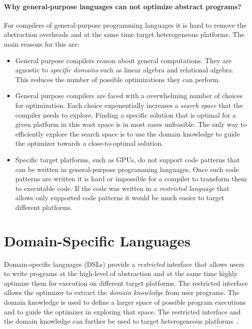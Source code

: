 \paragraph{Why general-purpose languages can not optimize abstract programs?} For compilers of
 general-purpose programming languages it is hard to remove the abstraction overheads
 and at the same time target heterogeneous platforms. The main reasons for this are:\begin{itemize}

 \item General purpose compilers reason about general computations. They are agnostic to
  \emph{specific domains} such as linear algebra and relational algebra. This reduces
   the number of possible optimizations they can perform.

 \item General purpose compilers are faced with a overwhelming number of choices
   for optimization. Each choice exponentially increases a \emph{search space}
   that the compiler needs to explore. Finding a specific solution that is optimal
   for a given platform in this wast space is in most cases unfeasible. The only way
   to efficiently explore the search space is to use the domain knowledge to guide
   the optimizer towards a close-to-optimal solution.

  \item Specific target platforms, such as GPUs, do not support code patterns
  that can be written in general-purpose programming languages. Once such code patterns are
  written it is hard or impossible for a compiler to transform them to executable code.
  If the code was written in a \emph{restricted language} that allows only supported code patterns
  it would be much easier to target different platforms.

 \end{itemize}

\section{Domain-Specific Languages}
\label{sec:domain-specific-languages}

Domain-specific languages (DSLs) provide a \emph{restricted} interface that allows
 users to write programs at the high-level of abstraction and at the
 same time highly optimize them for execution on different target platforms. The restricted
 interface allows the optimizer to extract the \emph{domain knowledge} from user programs.
 The domain knowledge is used to define a larger space of possible program executions
 and to guide the optimizer in exploring that space. The restricted interface and the domain knowledge
 can further be used to target heterogeneous platforms~\cite{chafi_language_2010}.

